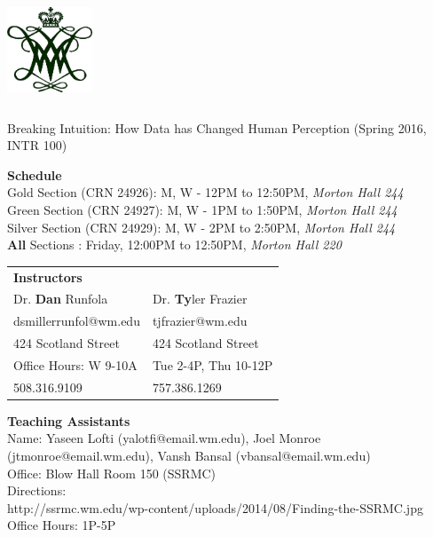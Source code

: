 \documentclass[11pt]{article}
\begin{document}
  \begin{center}

{\includegraphics[height=1.25in,width=1in]{wmchiffre1.jpg}} 

\LARGE Breaking Intuition: How Data has Changed Human Perception (Spring 2016, INTR 100)\\ \vspace{3mm}
\end{center}
\large \textbf{Schedule} \\
\normalsize \color{yellow}Gold \color{black} Section (CRN 24926): M, W - 12PM to 12:50PM, \textit{Morton Hall 244} \\
\color{green}Green \color{black} Section (CRN 24927): M, W - 1PM to 1:50PM, \textit{Morton Hall 244} \\
\color{gray}Silver \color{black} Section (CRN 24929): M, W - 2PM to 2:50PM, \textit{Morton Hall 244} \\
\textbf{All} \color{black} Sections : Friday, 12:00PM to 12:50PM, \textit{Morton Hall 220} \\
\vspace{2mm}

\begin{table}[ht]
\begin{tabular}{l l}
\large \textbf{Instructors} & \\
\large Dr. \textbf{Dan} Runfola & Dr. \textbf{Ty}ler Frazier \\
\large dsmillerrunfol@wm.edu  & tjfrazier@wm.edu \\
\large 424 Scotland Street & 424 Scotland Street \\
\large Office Hours: W 9-10A & Tue 2-4P, Thu 10-12P \\
\large 508.316.9109 & 757.386.1269 \\
\end{tabular}
\end{table}


\large \textbf{Teaching Assistants} \\
\large Name: Yaseen Lofti (yalotfi@email.wm.edu), Joel Monroe (jtmonroe@email.wm.edu), Vansh Bansal (vbansal@email.wm.edu)  \\
\large Office: Blow Hall Room 150 (SSRMC) \\
\large Directions: \\
http://ssrmc.wm.edu/wp-content/uploads/2014/08/Finding-the-SSRMC.jpg \\
\large Office Hours: 1P-5P \\
\end{document}
